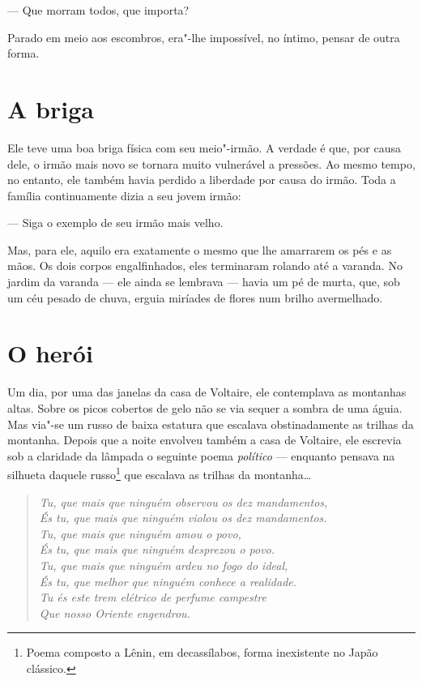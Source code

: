 --- Que morram todos, que importa?

Parado em meio aos escombros, era"-lhe impossível, no íntimo, pensar de
outra forma.

\section{A briga}

Ele teve uma boa briga física com seu meio"-irmão. A verdade é que, por
causa dele, o irmão mais novo se tornara muito vulnerável a pressões.
Ao mesmo tempo, no entanto, ele também havia perdido a liberdade por
causa do irmão. Toda a família continuamente dizia a seu jovem irmão:

--- Siga o exemplo de seu irmão mais velho.

Mas, para ele, aquilo era exatamente o mesmo que lhe amarrarem os pés e
as mãos. Os dois corpos engalfinhados, eles terminaram rolando até a
varanda. No jardim da varanda --- ele ainda se lembrava --- havia um pé de
murta, que, sob um céu pesado de chuva, erguia miríades de flores num
brilho avermelhado.

\section{O herói}

Um dia, por uma das janelas da casa de Voltaire, ele contemplava as
montanhas altas. Sobre os picos cobertos de gelo não se via sequer a
sombra de uma águia. Mas via"-se um russo de baixa estatura que escalava
obstinadamente as trilhas da montanha. Depois que a noite envolveu
também a casa de Voltaire, ele escrevia sob a claridade da lâmpada o
seguinte poema \textit{político} --- enquanto pensava na silhueta daquele
russo\footnote{ Poema composto a Lênin, em decassílabos, forma 
inexistente no Japão clássico.} que escalava as trilhas da montanha\ldots{}

\begin{verse}
\small{
\textit{Tu, que mais que ninguém observou os dez mandamentos,\\
És tu, que mais que ninguém violou os dez mandamentos.\\
Tu, que mais que ninguém amou o povo,\\
És tu, que mais que ninguém desprezou o povo.\\
Tu, que mais que ninguém ardeu no fogo do ideal,\\
És tu, que melhor que ninguém conhece a realidade.\\
Tu és este trem elétrico de perfume campestre\\
Que nosso Oriente engendrou.}}
\end{verse}

